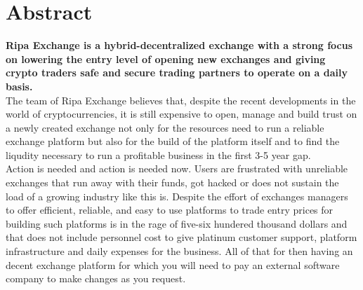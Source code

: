 \documentclass[11pt,fleqn,oneside]{book} %
\begin{document}

\begingroup
\thispagestyle{empty}
\endgroup

\newpage

\usechapterimagefalse %
\chapter{Abstract}
\textbf{Ripa Exchange is a hybrid-decentralized exchange with a strong focus on lowering the entry level
of opening new exchanges and giving crypto traders safe and secure trading partners to operate on a daily basis.}\\

The team of Ripa Exchange believes that, despite the recent developments in the world of
cryptocurrencies, it is still expensive to open, manage and build trust on a newly created exchange not
only for the resources need to run a reliable exchange platform but also for the build of the platform 
itself and to find the liqudity necessary to run a profitable business in the first 3-5 year gap.\\

Action is needed and action is needed now. Users are frustrated with unreliable exchanges that run away
with their funds, got hacked or does not sustain the load of a growing industry like this is. Despite
the effort of exchanges managers to offer efficient, reliable, and easy to use platforms to trade entry
prices for building such platforms is in the rage of five-six hundered thousand dollars and that does not 
include personnel cost to give platinum customer support, platform infrastructure and daily expenses for
the business. All of that for then having an decent exchange platform for which you will need to pay an 
external software company to make changes as you request.\\
\end{document}
